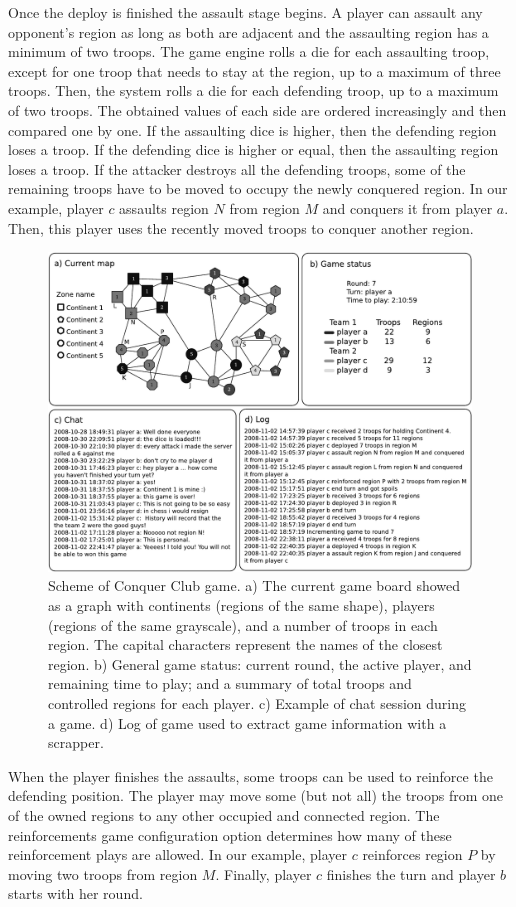 \documentclass[a4paper,10pt]{book}
\theoremstyle{definition}
\begin{document}
Once the deploy is finished the assault stage begins.
A player can assault any opponent's region as long as both are adjacent and the assaulting region has a minimum of two troops.
The game engine rolls a die for each assaulting troop, except for one troop that needs to stay at the region, up to a maximum of three troops.
Then, the system rolls a die for each defending troop, up to a maximum of two troops.
The obtained values of each side are ordered increasingly and then compared one by one.
If the assaulting dice is higher, then the defending region loses a troop.
If the defending dice is higher or equal, then the assaulting region loses a troop.
If the attacker destroys all the defending troops, some of the remaining troops have to be moved to occupy the newly conquered region.
In our example, player $c$ assaults region $N$ from region $M$ and conquers it from player $a$.
Then, this player uses the recently moved troops to conquer another region.

\begin{figure}[ht!]
    \centering
    \includegraphics[width=0.8\linewidth]{figures/Fig5}
    \caption{Scheme of Conquer Club game. a) The current game board showed as a graph with continents (regions of the same shape), players (regions of the same grayscale), and a number of troops in each region. The capital characters represent the names of the closest region. b) General game status: current round, the active player, and remaining time to play; and a summary of total troops and controlled regions for each player. c) Example of chat session during a game. d) Log of game used to extract game information with a scrapper.}
    \label{conquerImage}
\end{figure}

When the player finishes the assaults, some troops can be used to reinforce the defending position.
The player may move some (but not all) the troops from one of the owned regions to any other occupied and connected region.
The reinforcements game configuration option determines how many of these reinforcement plays are allowed.
In our example, player $c$ reinforces region $P$ by moving two troops from region $M$.
Finally, player $c$ finishes the turn and player $b$ starts with her round.
\end{document}
